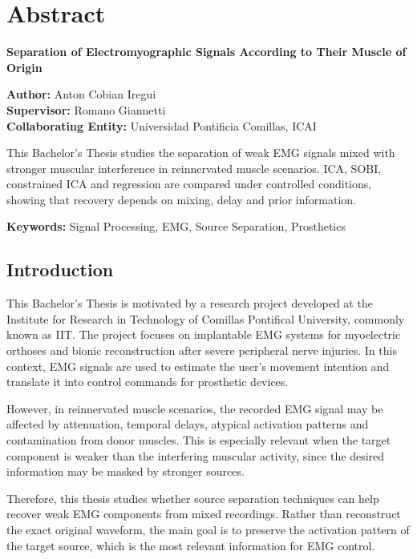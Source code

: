 \chapter*{Abstract}
\begin{flushleft}
  {\Large\bfseries Separation of Electromyographic Signals According to Their Muscle of Origin\\[0.4cm]}

  \textbf{Author:} Anton Cobian Iregui\\
  \textbf{Supervisor:} Romano Giannetti\\
  \textbf{Collaborating Entity:} Universidad Pontificia Comillas, ICAI
\end{flushleft}
This Bachelor’s Thesis studies the separation of weak EMG signals mixed with
stronger muscular interference in reinnervated muscle scenarios. ICA, SOBI,
constrained ICA and regression are compared under controlled conditions, showing that recovery depends on mixing, delay and prior information.

\medskip
\noindent\textbf{Keywords:} 
Signal Processing, EMG, Source Separation, Prosthetics
\bigskip

\section*{Introduction}

This Bachelor’s Thesis is motivated by a research project developed at the Institute for Research in Technology of Comillas Pontifical University, commonly known as IIT. The project focuses on implantable EMG systems for myoelectric orthoses and bionic reconstruction after severe peripheral nerve injuries. In this context, EMG signals are used to estimate the user’s movement intention and translate it into control commands for prosthetic devices.

However, in reinnervated muscle scenarios, the recorded EMG signal may be affected by attenuation, temporal delays, atypical activation patterns and contamination from donor muscles. This is especially relevant when the target component is weaker than the interfering muscular activity, since the desired information may be masked by stronger sources.

Therefore, this thesis studies whether source separation techniques can help recover weak EMG components from mixed recordings. Rather than reconstruct the exact original waveform, the main goal is to preserve the activation pattern of the target source, which is the most relevant information for EMG control.

